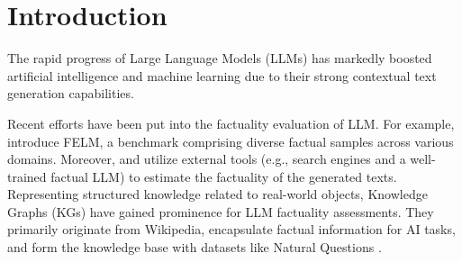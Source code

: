 
\section{Introduction}

The rapid progress of Large Language Models (LLMs) has markedly boosted artificial intelligence and machine learning due to their strong contextual text generation capabilities.




Recent efforts have been put into the factuality evaluation of LLM. For example, \cite{chen2023felm} introduce FELM, a benchmark comprising diverse factual samples across various domains. Moreover, \cite{tian2023finetuning} and \cite{feng-etal-2023-factkb} utilize external tools (e.g., search engines and a well-trained factual LLM) to estimate the factuality of the generated texts. Representing structured knowledge related to real-world objects, Knowledge Graphs (KGs) \cite{auer2007dbpedia, bollacker2008freebase, suchanek2007yago, carlson2010toward} have gained prominence for LLM factuality assessments. They primarily originate from Wikipedia, encapsulate factual information for AI tasks, and form the knowledge base with datasets like Natural Questions \cite{NaturalQuestions}. 


